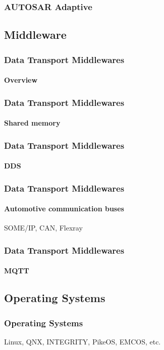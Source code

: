 \begin{frame}
\frametitle{AUTOSAR Adaptive}
\end{frame}

\subsection{Middleware}

\begin{frame}
\frametitle{Data Transport Middlewares}
\framesubtitle{Overview}
\end{frame}

\begin{frame}
\frametitle{Data Transport Middlewares}
\framesubtitle{Shared memory}
\end{frame}

\begin{frame}
\frametitle{Data Transport Middlewares}
\framesubtitle{DDS}
\end{frame}

\begin{frame}
\frametitle{Data Transport Middlewares}
\framesubtitle{Automotive communication buses}
SOME/IP, CAN, Flexray
\end{frame}

\begin{frame}
\frametitle{Data Transport Middlewares}
\framesubtitle{MQTT}
\end{frame}

\subsection{Operating Systems}

\begin{frame}
\frametitle{Operating Systems}
Linux, QNX, INTEGRITY, PikeOS, EMCOS, etc. 
\end{frame}